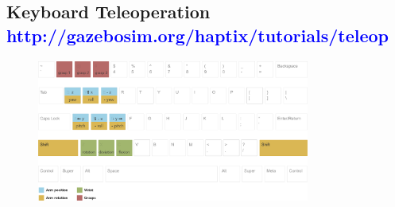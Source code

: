 \documentclass[11pt, letterpaper, landscape]{article}
\begin{document}
\begin{minipage}[t]{0.98\textwidth}
  \begin{tcolorbox}[colback=gray!8,colframe=gray!15]

    \section*{Keyboard Teleoperation \textcolor{blue}{\textnormal{\small http://gazebosim.org/haptix/tutorials/teleop}}}

    \begin{figure}[H]
      \centering
      \includegraphics[width=0.8\textwidth]{figures/keyboard.png}
    \end{figure}
  \end{tcolorbox}
\end{minipage}
\end{document}
